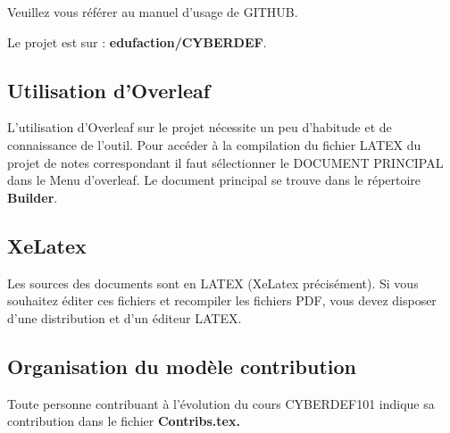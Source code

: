 Veuillez vous référer au manuel d'usage de GITHUB. 

Le projet est sur : \textbf{edufaction/CYBERDEF}.

\subsection{Utilisation d'Overleaf}

L'utilisation d'Overleaf sur le projet nécessite un peu d'habitude et de connaissance de l'outil. Pour accéder à la compilation du fichier LATEX du projet de notes correspondant il faut sélectionner le DOCUMENT PRINCIPAL dans le Menu d'overleaf. Le document principal se trouve dans le répertoire \textbf{Builder}.

\subsection{XeLatex}

Les sources des documents sont en LATEX (XeLatex précisément). Si vous souhaitez éditer ces fichiers et recompiler les fichiers PDF, vous devez disposer d'une distribution et d'un éditeur LATEX.




\subsection{Organisation du modèle contribution}

Toute personne contribuant à l'évolution du cours CYBERDEF101 indique sa contribution dans le fichier \bf{Contribs.tex}.

